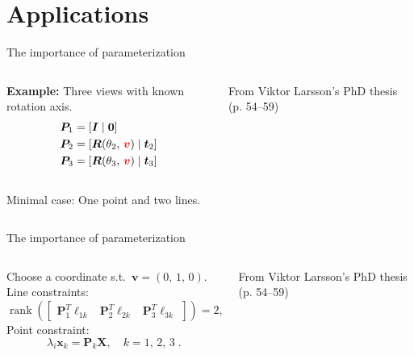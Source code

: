 \documentclass[aspectratio=169]{beamer}
\newcommand{\mat}[1]{\bm{#1}}
\DeclareMathOperator{\rank}{rank}
\newcommand{\T}{T}
\begin{document}
\section{Applications}
\begin{frame}[t]{The importance of parameterization}
\begin{columns}
    \begin{column}{0.5\textwidth}
        \begin{minipage}[t][\textheight][t]{\textwidth}
        \theimportanceOneHeight
        \textbf{Example:} Three views with known rotation axis.\\[8mm]
        \begin{equation*}
            \begin{aligned}
                \mat{P}_1 &= [\mat{I}\;|\;\mat{0}] \\
                \mat{P}_2 &= [\mat{R}(\theta_2,\,{\color{red}\mat{v}})\;|\;\mat{t}_2] \\
                \mat{P}_3 &= [\mat{R}(\theta_3,\,{\color{red}\mat{v}})\;|\;\mat{t}_3]
            \end{aligned}
        \end{equation*}\\[8mm]
        Minimal case: One point and two lines.
        \end{minipage}
    \end{column}%
    \begin{column}{0.5\textwidth}
        \centering
        
        {\footnotesize From Viktor Larsson's PhD thesis (p. 54--59)}
    \end{column}
\end{columns}
\end{frame}

\begin{frame}[t]{The importance of parameterization}
\begin{columns}
    \begin{column}{0.5\textwidth}
        \begin{minipage}[t][\textheight][t]{\textwidth}
        \theimportanceOneHeight
        Choose a coordinate s.t.\@~$\mat{v}=(0,\,1,\,0)$.\\[5mm]
        Line constraints:
        \[
            \rank\!\left(\begin{bmatrix}
                    \mat{P}_1^\T\mat{\ell}_{1k} &
                    \mat{P}_2^\T\mat{\ell}_{2k} &
                    \mat{P}_3^\T\mat{\ell}_{3k}
                \end{bmatrix}\right) = 2,
        \quad k = 1,\,2\;.
        \]
        Point constraint:
        \[
            \lambda_i\mat{x}_k = \mat{P}_k\mat{X},  \quad k=1,\,2,\, 3\;.
        \]
        \end{minipage}
    \end{column}%
    \begin{column}{0.5\textwidth}
        \centering
        
        {\footnotesize From Viktor Larsson's PhD thesis (p. 54--59)}
    \end{column}
\end{columns}
\end{frame}
\end{document}
